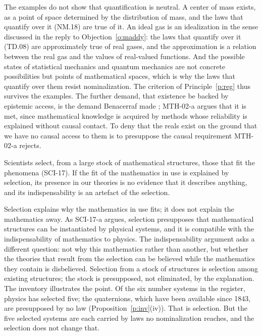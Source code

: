 \documentclass{situationist-preprint}
\begin{document}
\begin{reply}
The examples do not show that quantification is neutral. A center of mass exists, as a point of space determined by the distribution of mass, and the laws that quantify over it (NM.18) are true of it. An ideal gas is an idealization in the sense discussed in the reply to Objection~\ref{o:maddy}: the laws that quantify over it (TD.08) are approximately true of real gases, and the approximation is a relation between the real gas and the values of real-valued functions. And the possible states of statistical mechanics and quantum mechanics are not concrete possibilities but points of mathematical spaces, which is why the laws that quantify over them resist nominalization. The criterion of Principle~\ref{p:reg} thus survives the examples. The further demand, that existence be backed by epistemic access, is the demand Benacerraf made \citep{Benacerraf1973}; MTH-02-a argues that it is met, since mathematical knowledge is acquired by methods whose reliability is explained without causal contact. To deny that the reals exist on the ground that we have no causal access to them is to presuppose the causal requirement MTH-02-a rejects.
\end{reply}

\begin{objection}\label{o:sel}
Scientists select, from a large stock of mathematical structures, those that fit the phenomena (SCI-17). If the fit of the mathematics in use is explained by selection, its presence in our theories is no evidence that it describes anything, and its indispensability is an artefact of the selection.
\end{objection}

\begin{reply}
Selection explains why the mathematics in use fits; it does not explain the mathematics away. As SCI-17-a argues, selection presupposes that mathematical structures can be instantiated by physical systems, and it is compatible with the indispensability of mathematics to physics. The indispensability argument asks a different question: not why this mathematics rather than another, but whether the theories that result from the selection can be believed while the mathematics they contain is disbelieved. Selection from a stock of structures is selection among existing structures; the stock is presupposed, not eliminated, by the explanation. The inventory illustrates the point. Of the six number systems in the register, physics has selected five; the quaternions, which have been available since 1843, are presupposed by no law (Proposition~\ref{p:inv}(iv)). That is selection. But the five selected systems are each carried by laws no nominalization reaches, and the selection does not change that.
\end{reply}
\end{document}

